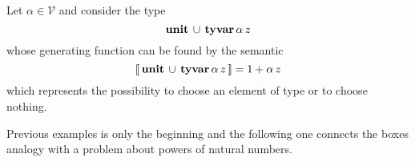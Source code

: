 \begin{example}
Let $\alpha\in\mathcal{V}$ and consider the type
\begin{displaymath}
    \textbf{unit}\,\cup\,\textbf{tyvar}\,\alpha\,z
\end{displaymath}
whose generating function can be found by the semantic
\begin{displaymath}
    \left\llbracket\,\textbf{unit}\,\cup\,\textbf{tyvar}\,\alpha\,z\,\right\rrbracket = 1 + \alpha\,z
\end{displaymath}
which represents the possibility to choose an element of type \tyvar{\alpha} or
to choose nothing.
\end{example}

Previous examples is only the beginning and the following one connects
the boxes analogy with a problem about powers of natural numbers.

